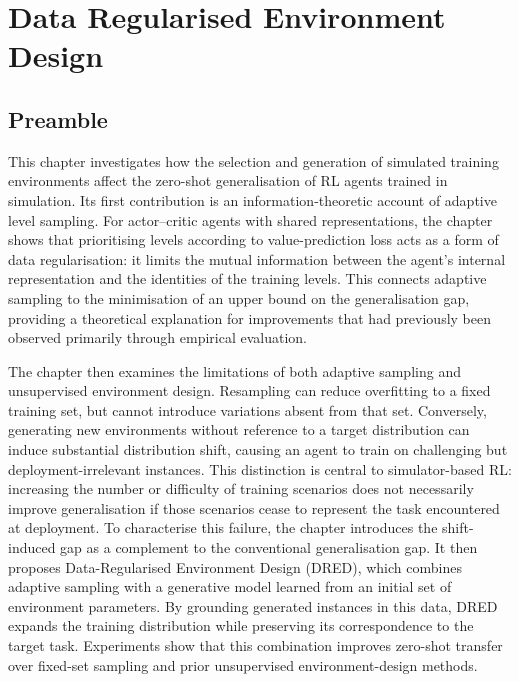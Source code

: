 \chapter{Data Regularised Environment Design}
\label{chap:dred}

\section{Preamble}

This chapter investigates how the selection and generation of simulated training environments affect the zero-shot generalisation of RL agents trained in simulation. Its first contribution is an information-theoretic account of adaptive level sampling. For actor--critic agents with shared representations, the chapter shows that prioritising levels according to value-prediction loss acts as a form of data regularisation: it limits the mutual information between the agent's internal representation and the identities of the training levels. This connects adaptive sampling to the minimisation of an upper bound on the generalisation gap, providing a theoretical explanation for improvements that had previously been observed primarily through empirical evaluation.

The chapter then examines the limitations of both adaptive sampling and unsupervised environment design. Resampling can reduce overfitting to a fixed training set, but cannot introduce variations absent from that set. Conversely, generating new environments without reference to a target distribution can induce substantial distribution shift, causing an agent to train on challenging but deployment-irrelevant instances. This distinction is central to simulator-based RL: increasing the number or difficulty of training scenarios does not necessarily improve generalisation if those scenarios cease to represent the task encountered at deployment. To characterise this failure, the chapter introduces the shift-induced gap as a complement to the conventional generalisation gap. It then proposes Data-Regularised Environment Design (\hbox{DRED}), which combines adaptive sampling with a generative model learned from an initial set of environment parameters. By grounding generated instances in this data, DRED expands the training distribution while preserving its correspondence to the target task. Experiments show that this combination improves zero-shot transfer over fixed-set sampling and prior unsupervised environment-design methods.

